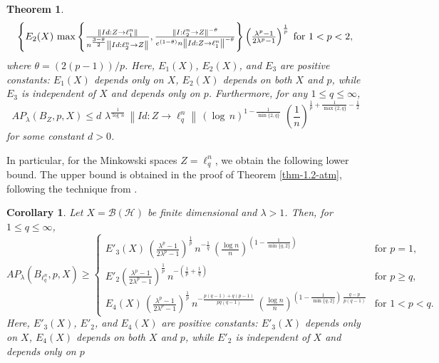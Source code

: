 \documentclass[a4paper,11pt, reqno]{amsart}
\newtheorem{thm}{Theorem}[section]
\newtheorem{cor}{Corollary}[section]
\theoremstyle{definition}
\newcommand{\norm}[1]{\left\lVert#1\right\rVert}
\begin{document}
\begin{thm}
\begin{equation*}
\begin{cases}
				E_{2}(X)\,  \max \left\{\frac{\norm{Id: Z \rightarrow \ell^n_{1}}}{n^{\frac{3-\theta}{2}} \norm{Id: \ell^n_{2} \rightarrow Z}},  \frac{\norm{I:\ell^n _2 \rightarrow Z}^{-\theta}}{e^{(1-\theta)}n \norm{Id: Z \rightarrow \ell^n_{1}}^{-\theta}}\right\}\left(\frac{\lambda^p -1}{2\lambda^p - 1}\right)^{\frac{1}{p}} \hspace{-2mm} & \text{for $1<p< 2$}, 
			\end{cases}
		\end{equation*}
		where $\theta = (2(p-1))/p$. Here, $E_{1}(X)$, $E_{2}(X)$, and $E_{3}$ are positive constants: $E_{1}(X)$ depends only on $X$, $E_{2}(X)$ depends on both $X$ and $p$, while $E_{3}$ is independent of $X$ and depends only on $p$. Furthermore,
		for any $1\leq q \leq \infty$,
		\begin{equation*}
			AP_{\lambda}(B_{Z}, p,X) \leq d\,\, \lambda^{\frac{1}{\log\,n}}\, \norm{Id:Z \rightarrow \ell^n_q}\, (\log\,n)^{1-\frac{1}{\min\{2,q\}}}\,\,\left(\frac{1}{n}\right)^{\frac{1}{p}+\frac{1}{\max\{2,q\}}-\frac{1}{2}}
		\end{equation*}
		for some constant $d>0$.
	\end{thm}
In particular, for the Minkowski spaces $Z=\ell^n _q$, we obtain the following lower bound. The upper bound is obtained in the proof of Theorem \ref{thm-1.2-atm}, following the technique from \cite{defant-2007}.
\begin{cor} \label{cor-1.4}
		Let $X=\mathcal{B}(\mathcal{H})$ be finite dimensional and $\lambda>1$. Then, for $1 \leq q \leq \infty$,
	\begin{equation*}
		AP_{\lambda}(B_{\ell^n _q}, p,X) \geq	\begin{cases}
			E'_{3}(X)\,\left(\frac{\lambda^p -1}{2\lambda^p - 1}\right)^{\frac{1}{p}}\, n^{-\frac{1}{q}} \, \left(\frac{\log n}{n}\right)^{ \left(1- \frac{1}{\min\{q,2\}}\right)} & \text{for $p=1$}, \\[2mm]
			E'_{2} \left(\frac{\lambda^p -1}{2\lambda^p - 1}\right)^{\frac{1}{p}}\, n^{-\left(\frac{1}{p}+\frac{1}{q}\right)} & \text{for $p \geq q$}, \\[2mm]
			
			E_{4}(X)\,  \left(\frac{\lambda^p -1}{2\lambda^p - 1}\right)^{\frac{1}{p}} \,n^{-\frac{p(q-1)+q(p-1)}{pq(q-1)}}\, \left( \frac{\log n}{n}\right)^{\left(1- \frac{1}{\min\{q,2\}}\right)\, \frac{q-p}{p(q-1)}} & \text{for $1<p< q$}. 
		\end{cases}
	\end{equation*}
	Here, $E'_{3}(X)$, $E'_{2}$, and $E_{4}(X)$ are positive constants: $E'_{3}(X)$ depends only on $X$, $E_{4}(X)$ depends on both $X$ and $p$, while $E'_{2}$ is independent of $X$ and depends only on $p$
\end{cor}
\end{document}

